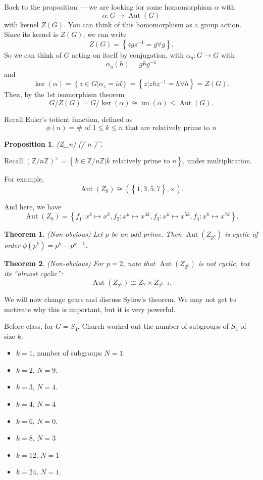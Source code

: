 \documentclass[12pt]{article}
\newtheorem*{theorem}{Theorem}
\newtheorem*{prop}{Proposition}
\newcommand{\ol}{\overline}
\DeclareMathOperator{\Aut}{Aut}
\DeclareMathOperator{\im}{im}
\def\ZZ{\mathbb{Z}}
\begin{document}
    Back to the proposition --- we are looking for some homomorphism $\alpha$ with
    \[
      \alpha: G \to \Aut(G)
    \]
    with kernel $Z(G)$.  You can think of this homomorphism as a group action.  Since its kernel is $Z(G)$, we can write
    \[
      Z(G)=  \left\{ zgz^{-1} = g \forall g \right\}.
    \]
    So we can think of $G$ acting on itself by conjugation, with $\alpha_g: G \to G$ with
    \[
      \alpha_g (h) = ghg^{-1}
    \]
    and
    \[
      \ker(\alpha) = \left\{ z \in G | \alpha_z = id \right\} = \left\{ z | zhz^{-1} = h \forall h \right\} = Z(G).
    \]
    Then, by the 1st isomorphism theorem
    \[
      G / Z(G) = G / \ker(\alpha) \cong \im(\alpha) \leq \Aut(G).
    \]

    Recall Euler's totient function, defined as
    \[
      \phi(n) = \text{# of $1 \leq k \leq n$ that are relatively prime to $n$}
    \]

    \begin{prop}
      \Aut(Z_n) \cong (\ZZ / n \ZZ)^{\times}.
    \end{prop}

    Recall $(\ZZ / n \ZZ)^{\times} = \left\{ \ol{k} \in \ZZ / n \ZZ | \ol{k} \text{ relatively prime to $n$} \right\}$, under multiplication.

    For example,
    \[
      \Aut(Z_8) \cong (\left\{ \ol{1}, \ol{3}, \ol{5}, \ol{7} \right\}, \times).
    \]

    And here, we have
    \[
      \Aut(Z_8) = \left\{ f_1: x^k \mapsto x^{k}, f_2: x^{k} \mapsto x^{3k}, f_3: x^{k} \mapsto x^{5k}, f_4: x^{k} \mapsto x^{7k} \right\}.
      \]

  \begin{theorem}
    (Non-obvious) Let $p$ be an odd prime.  Then $\Aut(Z_{p^k})$ is cyclic of order $\phi(p^k) = p^k - p^{k-1}$.
  \end{theorem}

  \begin{theorem}
    (Non-obvious) For $p = 2$, note that $\Aut(Z_{2^k})$ is not cyclic, but its ``almost cyclic'':
    \[
      \Aut(Z_{2^{k}}) \cong Z_2 \times Z_{2^{k-2}}.
    \]
  \end{theorem}

  We will now change gears and discuss Sylow's theorem.  We may not get to motivate why this is important, but it is very powerful.

  Before class, for $G = S_4$, Church worked out the number of subgroups of $S_4$ of size $k$.

  \begin{itemize}
    \item $k = 1$, number of subgroups $N = 1$.
    \item $k=2$, $N = 9$.
    \item $k=3$, $N=4$.
    \item $k=4$, $N = 4$
    \item $k=6$, $N = 0$.
    \item $k=8$, $N=3$
    \item $k=12$, $N=1$
    \item $k=24$, $N=1$.
  \end{itemize}
\end{document}
